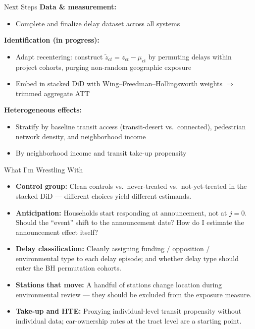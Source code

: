 \documentclass{beamer}
\begin{document}
\begin{frame}{Next Steps}
\label{slide:nextsteps}
\small
\textbf{Data \& measurement:}
\begin{itemize}
  \item Complete and finalize delay dataset across all systems
\end{itemize}

\bigskip
\textbf{Identification (in progress):}
\begin{itemize}
  \item Adapt \textcite{borusyakNonrandomExposureExogenous2023} recentering: construct
        $\tilde{z}_{ct} = z_{ct} - \mu_{ct}$ by permuting delays within
        project cohorts, purging non-random geographic exposure
  \item Embed in stacked DiD \parencite{wingStackedDifferenceinDifferences2024} with
        Wing--Freedman--Hollingsworth weights $\Rightarrow$ trimmed aggregate ATT
\end{itemize}

\bigskip
\textbf{Heterogeneous effects:}
\begin{itemize}
  \item Stratify by baseline transit access (transit-desert vs.\ connected),
        pedestrian network density, and neighborhood income
  \item By neighborhood income and transit take-up propensity
\end{itemize}
\end{frame}

\begin{frame}{What I'm Wrestling With}
\small
\begin{itemize}
  \item \textbf{Control group:} Clean controls vs.\ never-treated vs.\
        not-yet-treated in the stacked DiD --- different choices yield
        different estimands.
  \item \textbf{Anticipation:} Households start responding at announcement,
        not at $j=0$. Should the ``event'' shift to the announcement date?
        How do I estimate the announcement effect itself?
  \item \textbf{Delay classification:} Cleanly assigning funding / opposition /
        environmental type to each delay episode; and whether delay type should
        enter the BH permutation cohorts.
  \item \textbf{Stations that move:} A handful of stations change location during
        environmental review --- they should be excluded from the exposure measure.
  \item \textbf{Take-up and HTE:} Proxying individual-level transit propensity
        without individual data; car-ownership rates at the tract level
        are a starting point.
\end{itemize}
\end{frame}
\end{document}
